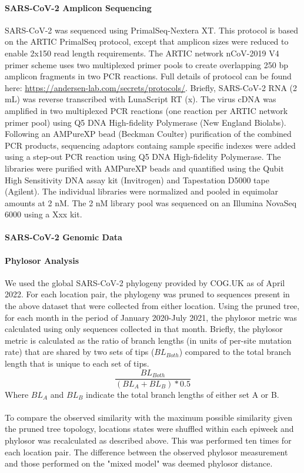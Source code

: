 \documentclass[12pt, a4paper]{article}
\begin{document}
    \paragraph{SARS-CoV-2 Amplicon Sequencing}
    SARS-CoV-2 was sequenced using PrimalSeq-Nextera XT\@.
    This protocol is based on the ARTIC PrimalSeq protocol, except that amplicon sizes were reduced to enable 2x150 read length requirements.
    The ARTIC network nCoV-2019 V4 primer scheme uses two multiplexed primer pools to create overlapping 250 bp amplicon fragments in two PCR reactions.
    Full details of protocol can be found here: \url{https://andersen-lab.com/secrets/protocols/}.
    Briefly, SARS-CoV-2 RNA (2 mL) was reverse transcribed with LunaScript RT (x).
    The virus cDNA was amplified in two multiplexed PCR reactions (one reaction per ARTIC network primer pool) using Q5 DNA High-fidelity Polymerase (New England Biolabs).
    Following an AMPureXP bead (Beckman Coulter) purification of the combined PCR products, sequencing adaptors containg sample specific indexes were added using a step-out PCR reaction using Q5 DNA High-fidelity Polymerase.
    The libraries were purified with AMPureXP beads and quantified using the Qubit High Sensitivity DNA assay kit (Invitrogen) and Tapestation D5000 tape (Agilent).
    The individual libraries were normalized and pooled in equimolar amounts at 2 nM\@.
    The 2 nM library pool was sequenced on an Illumina NovaSeq 6000 using a Xxx kit.
    \paragraph{SARS-CoV-2 Genomic Data}

    \paragraph{Phylosor Analysis}
    We used the global SARS-CoV-2 phylogeny provided by COG.UK as of April 2022.
    For each location pair, the phylogeny was pruned to sequences present in the above dataset that were collected from either location.
    Using the pruned tree, for each month in the period of January 2020-July 2021, the phylosor metric was calculated using only sequences collected in that month.
    Briefly, the phylosor metric is calculated as the ratio of branch lengths (in units of per-site mutation rate) that are shared by two sets of tips (\(BL_{Both}\)) compared to the total branch length that is unique to each set of tips.
    \[
        \frac{BL_{Both}}{(BL_A + BL_B) * 0.5}
    \]
    Where \(BL_A\) and \(BL_B\) indicate the total branch lengths of either set A or B\@.
    \\~\\
    To compare the observed similarity with the maximum possible similarity given the pruned tree topology, locations states were shuffled within each epiweek and phylosor was recalculated as described above.
    This was performed ten times for each location pair.
    The difference between the observed phylosor measurement and those performed on the "mixed model" was deemed phylosor distance.
\end{document}
